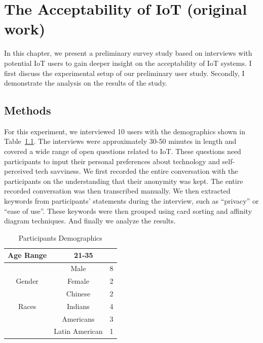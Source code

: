 
\chapter{The Acceptability of IoT (original work)}\label{chapter:acceptability}

In this chapter, we present a preliminary survey study based on interviews with potential IoT users to gain deeper insight on the acceptability of IoT systems. I first discuss the experimental setup of our preliminary user study. Secondly, I demonstrate the analysis on the results of the study.

\section{Methods}

For this experiment, we interviewed 10 users with the demographics shown in Table~\ref{tab:demographics1}. The interviews were approximately 30-50 minutes in length and covered a wide range of open questions related to IoT. These questions need participants to input their personal preferences about technology and self-perceived tech savviness. We first recorded the entire conversation with the participants on the understanding that their anonymity was kept. The entire recorded conversation was then transcribed manually. We then extracted keywords from participants' statements during the interview, such as ``privacy'' or ``ease of use''. These keywords were then grouped using card sorting and affinity diagram techniques. And finally we analyze the results.

\begin {table}
\caption {Participants Demographics} \label{tab:demographics1}
\begin{center}
	\begin{tabular}{c|c|c}
		\hline
		Age Range & \multicolumn{2}{c}{ 21-35 }\\
		\hline
		& Male & 8 \\
		\cline{2-3}
		Gender    & Female & 2 \\
		\hline
		& Chinese & 2 \\
		\cline{2-3}
		Races 	  & Indians & 4 \\
		\cline{2-3}
		& Americans & 3 \\
		\cline{2-3}
		& Latin American & 1\\
		\hline
	\end{tabular}
\end{center}
\end {table}


